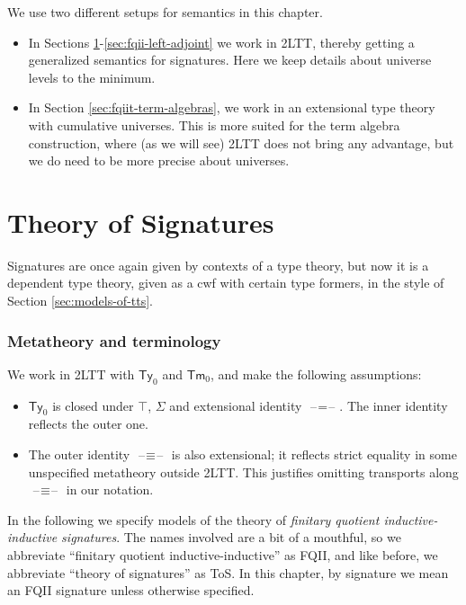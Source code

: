 \documentclass[12pt,a4paper,twoside,openany]{book}
\theoremstyle{remark}
\theoremstyle{definition}
\theoremstyle{theorem}
\newcommand{\Tm}{\mathsf{Tm}}
\newcommand{\Ty}{\mathsf{Ty}}
\newcommand{\blank}{\mathord{\hspace{1pt}\text{--}\hspace{1pt}}}
\begin{document}
We use two different setups for semantics in this chapter.
\begin{itemize}
  \item In Sections \ref{sec:fqiit-tos}-\ref{sec:fqii-left-adjoint} we work in 2LTT, thereby
        getting a generalized semantics for signatures. Here we keep details about universe
        levels to the minimum.
  \item In Section \ref{sec:fqiit-term-algebras}, we work in an
        extensional type theory with cumulative universes. This is more suited for the term
        algebra construction, where (as we will see) 2LTT does not bring any advantage, but
        we do need to be more precise about universes.
\end{itemize}


\section{Theory of Signatures}
\label{sec:fqiit-tos}

Signatures are once again given by contexts of a type theory, but now it is a
dependent type theory, given as a cwf with certain type formers, in the style
of Section \ref{sec:models-of-tts}.

\subsubsection{Metatheory and terminology}
We work in 2LTT with $\Ty_0$ and $\Tm_0$, and make the following assumptions:
\begin{itemize}
  \item $\Ty_0$ is closed under $\top$, $\Sigma$ and extensional identity $\blank\!=\!\blank$.
        The inner identity reflects the outer one.
  \item The outer identity $\blank\!\equiv\!\blank$ is also extensional; it
    reflects strict equality in some unspecified metatheory outside 2LTT. This
    justifies omitting transports along $\blank\!\equiv\!\blank$ in our
    notation.
\end{itemize}

In the following we specify models of the theory of \emph{finitary quotient
inductive-inductive signatures}. The names involved are a bit of a mouthful, so
we abbreviate ``finitary quotient inductive-inductive'' as FQII, and like
before, we abbreviate ``theory of signatures'' as ToS. In this chapter, by
signature we mean an FQII signature unless otherwise specified.
\end{document}

